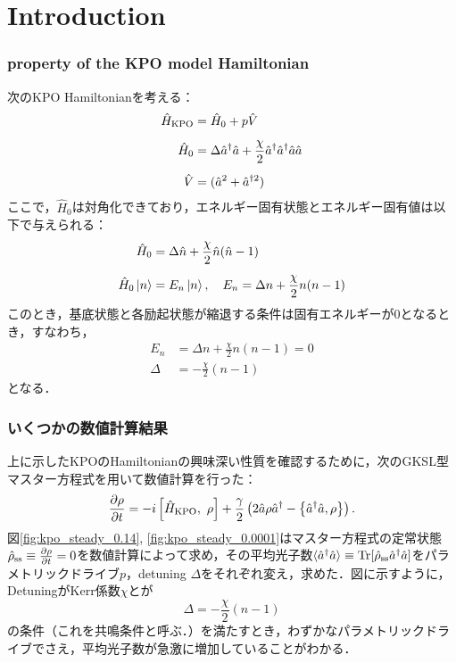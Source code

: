 \part{Introduction}
\section{property of the KPO model Hamiltonian}
次のKPO Hamiltonianを考える：
\begin{align}
    \hat{H}_{\rm{KPO}}&=\hat{H}_0 +p\hat{V}\\[5pt]
    \hat{H}_0&=\Delta \hat{a}^\dagger\hat{a} + \frac{\chi}{2} \hat{a}^\dagger\hat{a}^\dagger\hat{a}\hat{a}\\[5pt]
    \hat{V}&=(\hat{a}^2 + \hat{a}^{\dagger 2})
\end{align}
ここで，$\hat{H}_0$は対角化できており，エネルギー固有状態とエネルギー固有値は以下で与えられる：
\begin{align}
    \hat{H}_0&=\Delta \hat{n} + \frac{\chi}{2}\hat{n}(\hat{n}-1) \\[5pt]
    \hat{H}_0\ket{n}&=E_n\ket{n},\ \ \ 
    E_n = \Delta n + \frac{\chi}{2}n(n-1)
\end{align}
このとき，基底状態と各励起状態が縮退する条件は固有エネルギーが0となるとき，すなわち，
\begin{align}
        E_n &= \Delta n + \frac{\chi}{2}n(n-1) =0\\[10pt]
        \Delta &= -\frac{\chi}{2}(n-1)
\end{align}
となる．


\section{いくつかの数値計算結果}
上に示したKPOのHamiltonianの興味深い性質を確認するために，次のGKSL型マスター方程式を用いて数値計算を行った：
\begin{align}\label{Eq.GKSL}
\frac{\partial\rho}{\partial t} = -i\left[\hat{H}_{\rm{KPO}} 
,\ \rho\right] 
+\frac{\gamma}{2} \left (2\hat a \rho \hat a^\dagger - \left\{ \hat a^\dagger \hat a, \rho \right\}\right).
\end{align}
図\ref{fig:kpo_steady_0.14}, \ref{fig:kpo_steady_0.0001}はマスター方程式の定常状態$\hat{\rho}_{\rm{ss}}\equiv\frac{\partial\rho}{\partial t}=0$を数値計算によって求め，その平均光子数$\braket{\hat{a}^\dagger\hat{a}}\equiv\mathrm{Tr}[\hat{\rho}_{\rm{ss}}\hat{a}^\dagger\hat{a}]$をパラメトリックドライブ$p$，detuning $\Delta$をそれぞれ変え，求めた．図に示すように，DetuningがKerr係数$\chi$とが
\begin{equation}\label{on-resonant}
    \Delta = -\frac{\chi}{2}(n-1)
\end{equation}
の条件（これを共鳴条件と呼ぶ．）を満たすとき，わずかなパラメトリックドライブでさえ，平均光子数が急激に増加していることがわかる．


